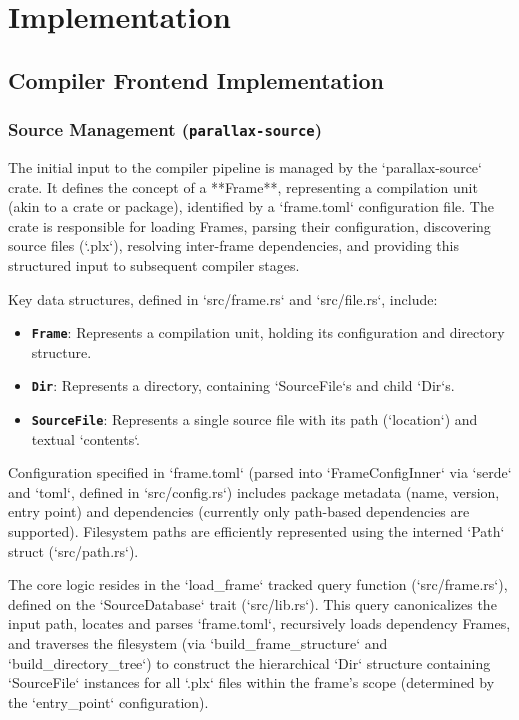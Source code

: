 \chapter{Implementation}


\section{Compiler Frontend Implementation} %

\subsection{Source Management (\texttt{parallax-source})} %
The initial input to the compiler pipeline is managed by the `parallax-source` crate. It defines the concept of a **Frame**, representing a compilation unit (akin to a crate or package), identified by a `frame.toml` configuration file. The crate is responsible for loading Frames, parsing their configuration, discovering source files (`.plx`), resolving inter-frame dependencies, and providing this structured input to subsequent compiler stages.

Key data structures, defined in `src/frame.rs` and `src/file.rs`, include:
\begin{itemize}
    \item \textbf{\texttt{Frame}}: Represents a compilation unit, holding its configuration and directory structure.
    \item \textbf{\texttt{Dir}}: Represents a directory, containing `SourceFile`s and child `Dir`s.
    \item \textbf{\texttt{SourceFile}}: Represents a single source file with its path (`location`) and textual `contents`.
\end{itemize}
Configuration specified in `frame.toml` (parsed into `FrameConfigInner` via `serde` and `toml`, defined in `src/config.rs`) includes package metadata (name, version, entry point) and dependencies (currently only path-based dependencies are supported). Filesystem paths are efficiently represented using the interned `Path` struct (`src/path.rs`).

The core logic resides in the `load_frame` tracked query function (`src/frame.rs`), defined on the `SourceDatabase` trait (`src/lib.rs`). This query canonicalizes the input path, locates and parses `frame.toml`, recursively loads dependency Frames, and traverses the filesystem (via `build_frame_structure` and `build_directory_tree`) to construct the hierarchical `Dir` structure containing `SourceFile` instances for all `.plx` files within the frame's scope (determined by the `entry_point` configuration).

